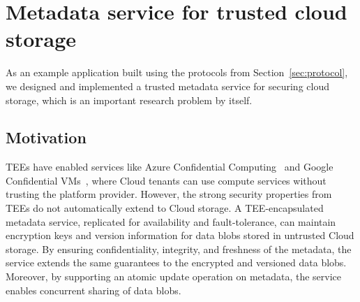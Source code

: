 \label{chap:tee}
\cleardoublepage{}



\section{Metadata service for trusted cloud storage}\label{sec:metadata}

As an example application built using the protocols from
Section~\ref{sec:protocol}, we
designed and implemented a trusted metadata service for securing
cloud storage, which is an important research problem by itself.

\subsection{Motivation}

\acp{TEE} have enabled services like Azure Confidential
Computing~\cite{azure-conf} and Google Confidential
VMs~\cite{google-confVM}, where Cloud tenants can use compute services
without trusting the platform provider.  However, the strong security
properties from \acp{TEE} do not automatically extend to Cloud storage.
%
A \ac{TEE}-encapsulated metadata service, replicated for
availability and fault-tolerance, can maintain encryption keys
and version information for data blobs stored in untrusted Cloud
storage.  By ensuring confidentiality, integrity, and freshness
of the metadata, the service extends the same guarantees to
the encrypted and versioned data blobs. Moreover, by supporting
an atomic update operation on metadata, the service enables
concurrent sharing of data blobs.

